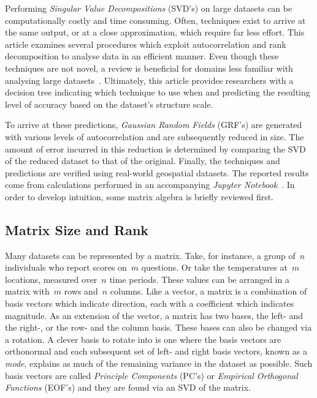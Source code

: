 \documentclass[ijgi,article,submit,moreauthors,pdftex,10pt,a4paper]{Definitions/mdpi}
\begin{document}
Performing \textit{Singular Value Decompositions} (SVD's) on large datasets can be computationally costly and time consuming. Often, techniques exist to arrive at the same output, or at a close approximation, which require far less effort. This article examines several procedures which exploit autocorrelation and rank decomposition to analyse data in an efficient manner. Even though these techniques are not novel, a review is beneficial for domains less familiar with analysing large datasets~\cite{Golub1970, Bjorck1973, Chan1982}. Ultimately, this article provides researchers with a decision tree indicating which technique to use when and predicting the resulting level of accuracy based on the dataset's structure scale.

To arrive at these predictions, \textit{Gaussian Random Fields} (GRF's) are generated with various levels of autocorrelation and are subsequently reduced in size. The amount of error incurred in this reduction is determined by comparing the SVD of the reduced dataset to that of the original. Finally, the techniques and predictions are verified using real-world geospatial datasets. The reported results come from calculations performed in an accompanying \textit{Jupyter Notebook}~\cite{Bogaardt2018}. In order to develop intuition, some matrix algebra is briefly reviewed first.

\subsection{Matrix Size and Rank}
\label{sec:Introduction/Matrix Size and Rank}

Many datasets can be represented by a matrix. Take, for instance, a group of~$n$ individuals who report scores on~$m$ questions. Or take the temperatures at~$m$ locations, measured over~$n$ time periods. These values can be arranged in a matrix with~$m$ rows and~$n$ columns. Like a vector, a matrix is a combination of basis vectors which indicate direction, each with a coefficient which indicates magnitude. As an extension of the vector, a matrix has two bases, the left- and the right-, or the row- and the column basis. These bases can also be changed via a rotation. A clever basis to rotate into is one where the basis vectors are orthonormal and each subsequent set of left- and right basis vectors, known as a \textit{mode}, explains as much of the remaining variance in the dataset as possible. Such basis vectors are called \textit{Principle Components} (PC's) or \textit{Empirical Orthogonal Functions} (EOF's) and they are found via an SVD of the matrix.
\end{document}
